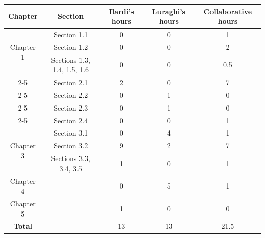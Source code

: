 \begin{table}[h!]
\centering
\label{tab:example}
\begin{tabular}{|c|c|c|c|c|}
\hline
\textbf{Chapter} & \textbf{Section} & \textbf{Ilardi's hours} & \textbf{Luraghi's hours} & \textbf{Collaborative hours} \\ \hline
\multirow{3}{*}{Chapter 1} & Section 1.1 & 0 & 0 & 1\\ \cline{2-5}
                           & Section 1.2 & 0 & 0 & 2 \\ \cline{2-5}
                           & Sections 1.3, 1.4, 1.5, 1.6 & 0 & 0 & 0.5 \\ \cline{2-5}
                            \hline
\multirow{4}{*}{Chapter 2} & Section 2.1 & 2 & 0 & 7 \\ \cline{2-5}
                           & Section 2.2 & 0 & 1 & 0 \\ \cline{2-5}
                           & Section 2.3 & 0 & 1 & 0 \\ \cline{2-5}
                           & Section 2.4 & 0 & 0 & 1 \\ \hline
\multirow{3}{*}{Chapter 3} & Section 3.1 & 0 & 4 & 1 \\ \cline{2-5}
                           & Section 3.2 & 9 & 2 & 7 \\ \cline{2-5}
                           & Sections 3.3, 3.4, 3.5 & 1 & 0 & 1 \\ \hline
\multirow{1}{*}{Chapter 4} &  & 0 & 5 & 1 \\ \hline
\multirow{1}{*}{Chapter 5} &  & 1 & 0 & 0 \\ \hline

\multirow{1}{*}{\textbf{Total}} &  & 13 & 13 & 21.5 \\ \hline

\end{tabular}
\end{table}